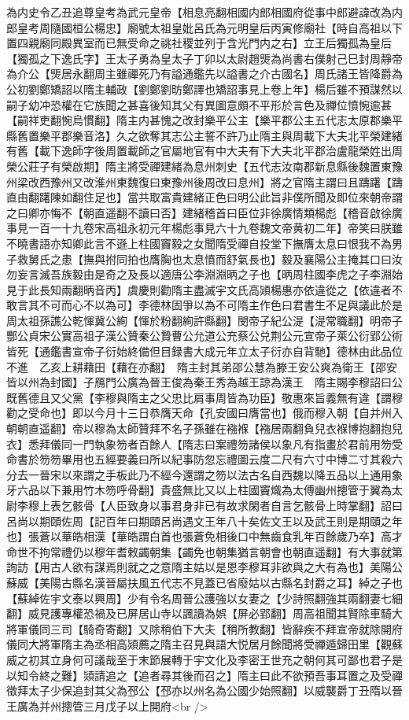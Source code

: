 為内史令乙丑追尊皇考為武元皇帝【相息亮翻相國内郎相國府從事中郎避諱改為内郎皇考周隨國桓公楊忠】廟號太祖皇妣呂氏為元明皇后丙寅修廟社【時自高祖以下置四親廟同殿異室而已無受命之祧社稷並列于含光門内之右】立王后獨孤為皇后【獨孤之下逸氏字】王太子勇為皇太子丁卯以太尉趙煚為尚書右僕射己巳封周靜帝為介公【煚居永翻周主雖禪死乃有謚通鑑先以謚書之介古國名】周氏諸王皆降爵為公初劉鄭矯詔以隋主輔政【劉鄭劉昉鄭譯也矯詔事見上卷上年】楊后雖不預謀然以嗣子幼冲恐權在它族聞之甚喜後知其父有異圖意頗不平形於言色及禪位憤惋逾甚【嗣祥吏翻惋烏慣翻】隋主内甚愧之改封樂平公主【樂平郡公主五代志太原郡樂平縣舊置樂平郡樂音洛】久之欲奪其志公主誓不許乃止隋主與周載下大夫北平榮建緒有舊【載下逸師字後周置載師之官屬地官有中大夫有下大夫北平郡治盧龍榮姓出周榮公莊子有榮啟期】隋主將受禪建緒為息州刺史【五代志汝南郡新息縣後魏置東豫州梁改西豫州又改淮州東魏復曰東豫州後周改曰息州】將之官隋主謂曰且躊躇【躊直由翻躇陳如翻住足也】當共取富貴建緒正色曰明公此旨非僕所聞及即位來朝帝謂之曰卿亦悔不【朝直遥翻不讀曰否】建緒稽首曰臣位非徐廣情類楊彪【稽音啟徐廣事見一百一十九卷宋高祖永初元年楊彪事見六十九卷魏文帝黄初二年】帝笑曰朕雖不曉書語亦知卿此言不遜上柱國竇毅之女聞隋受禪自投堂下撫膺太息曰恨我不為男子救舅氏之患【撫與拊同拍也膺胸也太息憤而舒氣長也】毅及襄陽公主掩其口曰汝勿妄言滅吾族毅由是奇之及長以適唐公李淵淵昞之子也【昞周柱國李虎之子李淵始見于此長知兩翻昞音丙】虞慶則勸隋主盡滅宇文氏高熲楊惠亦依違從之【依違者不敢言其不可而心不以為可】李德林固爭以為不可隋主作色曰君書生不足與議此於是周太祖孫譙公乾惲冀公絢【惲於粉翻絢許縣翻】閔帝子紀公湜【湜常職翻】明帝子酆公貞宋公實高祖子漢公贊秦公贄曹公允道公充蔡公兑荆公元宣帝子萊公衍郢公術皆死【通鑑書宣帝子衍始終備但目録書大成元年立太子衍亦自背馳】德林由此品位不進　乙亥上耕藉田【藉在亦翻】　隋主封其弟邵公慧為滕王安公爽為衛王【邵安皆以州為封國】子鴈門公廣為晉王俊為秦王秀為越王諒為漢王　隋主賜李穆詔曰公既舊德且又父黨【李穆與隋主之父忠比肩事周皆為功臣】敬惠來旨義無有違【謂穆勸之受命也】即以今月十三日恭膺天命【孔安國曰膺當也】俄而穆入朝【自并州入朝朝直遥翻】帝以穆為太師贊拜不名子孫雖在襁褓【襁居兩翻負兒衣褓博抱翻抱兒衣】悉拜儀同一門執象笏者百餘人【隋志曰案禮笏諸侯以象凡有指畫於君前用笏受命書於笏笏畢用也五經要義曰所以紀事防忽忘禮圖云度二尺有六寸中博二寸其殺六分去一晉宋以來謂之手板此乃不經今還謂之笏以法古名自西魏以降五品以上通用象牙六品以下兼用竹木笏呼骨翻】貴盛無比又以上柱國竇熾為太傅幽州摠管于翼為太尉李穆上表乞骸骨【人臣致身以事君身非已有故求閑者自言乞骸骨上時掌翻】詔曰呂尚以期頤佐周【記百年曰期頤呂尚遇文王年八十矣佐文王以及武王則是期頤之年也】張蒼以華皓相漢【華皓謂白首也張蒼免相後口中無齒食乳年百餘歲乃卒】高才命世不拘常禮仍以穆年耆敕蠲朝集【蠲免也朝集猶言朝會也朝直遥翻】有大事就第詢訪【用古人欲有謀焉則就之之意隋主姑以是恩李穆耳非欲與之大有為也】美陽公蘇威【美陽古縣名漢晉屬扶風五代志不見蓋已省廢姑以古縣名封爵之耳】綽之子也【蘇綽佐宇文泰以興周】少有令名周晉公護強以女妻之【少詩照翻強其兩翻妻七細翻】威見護專權恐禍及已屏居山寺以諷讀為娯【屏必郢翻】周高祖聞其賢除車騎大將軍儀同三司【騎奇寄翻】又除稍伯下大夫【稍所教翻】皆辭疾不拜宣帝就除開府儀同大將軍隋主為丞相高熲薦之隋主召見與語大悦居月餘聞將受禪遁歸田里【觀蘇威之初其立身何可議哉至于末節展轉于宇文化及李密王世充之朝何其可鄙也君子是以知令終之難】熲請追之【追者尋其後而召之】隋主曰此不欲預吾事耳置之及受禪徵拜太子少保追封其父為邳公【邳亦以州名為公國少始照翻】以威襲爵丁丑隋以晉王廣為并州摠管三月戊子以上開府<br />
